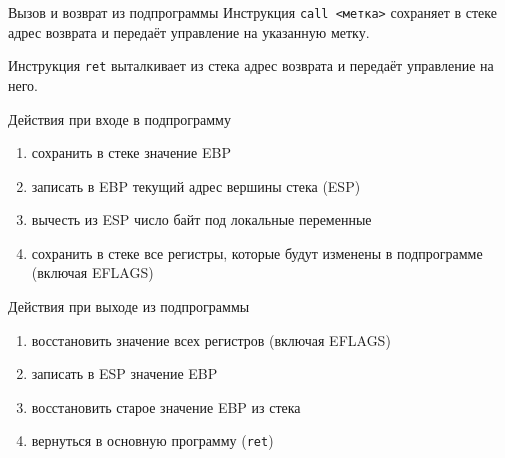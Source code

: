 \documentclass[utf8, russian]{beamer}
\begin{document}
    \begin{frame}{Вызов и возврат из подпрограммы}\small
        Инструкция {\tt call <метка>} сохраняет в стеке адрес возврата и передаёт управление на указанную метку.

        Инструкция {\tt ret} выталкивает из стека адрес возврата и передаёт управление на него.

        \begin{block}{Действия при входе в подпрограмму}\small
            \begin{enumerate}
                \item сохранить в стеке значение EBP
                \item записать в EBP текущий адрес вершины стека (ESP)
                \item вычесть из ESP число байт под локальные переменные
                \item сохранить в стеке все регистры, которые будут изменены в подпрограмме (включая EFLAGS)
            \end{enumerate}
        \end{block}

        \begin{block}{Действия при выходе из подпрограммы}\small
            \begin{enumerate}
                \item восстановить значение всех регистров (включая EFLAGS)
                \item записать в ESP значение EBP
                \item восстановить старое значение EBP из стека
                \item вернуться в основную программу ({\tt  ret})
            \end{enumerate}
        \end{block}
    \end{frame}
\end{document}
